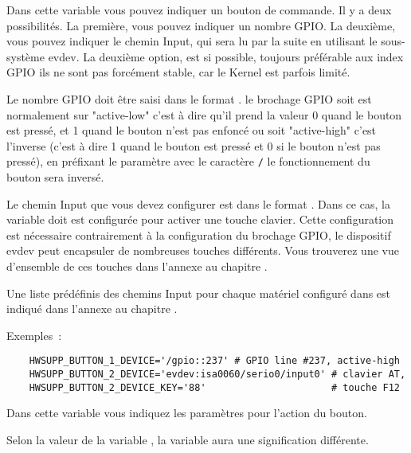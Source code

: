 \begin{description}

  Dans cette variable vous pouvez indiquer un bouton de commande. Il y a deux
  possibilités. La première, vous pouvez indiquer un nombre GPIO. La deuxième,
  vous pouvez indiquer le chemin Input, qui sera lu par la suite en utilisant
  le sous-système evdev. La deuxième option, est si possible, toujours préférable
  aux index GPIO ils ne sont pas forcément stable, car le Kernel est parfois limité.
  
  Le nombre GPIO doit être saisi dans le format . le brochage GPIO soit
  est normalement sur "active-low" c'est à dire qu'il prend la valeur 0 quand le bouton
  est pressé, et 1 quand le bouton n'est pas enfoncé ou soit "active-high" c'est
  l'inverse (c'est à dire 1 quand le bouton est pressé et 0 si le bouton n'est pas
  pressé), en préfixant le paramètre avec le caractère \texttt{/} le fonctionnement
  du bouton sera inversé.
  
  Le chemin Input que vous devez configurer est dans le format .
  Dans ce cas, la variable  doit est configurée
  pour activer une touche clavier. Cette configuration est nécessaire contrairement
  à la configuration du brochage GPIO, le dispositif evdev peut encapsuler de nombreuses
  touches différents. Vous trouverez une vue d'ensemble de ces touches dans
  l'annexe au chapitre .
  
  Une liste prédéfinis des chemins Input pour chaque matériel configuré dans 
  est indiqué dans l'annexe au chapitre .

  Exemples~:
  \begin{verbatim}
    HWSUPP_BUTTON_1_DEVICE='/gpio::237' # GPIO line #237, active-high
    HWSUPP_BUTTON_2_DEVICE='evdev:isa0060/serio0/input0' # clavier AT,
    HWSUPP_BUTTON_2_DEVICE_KEY='88'                      # touche F12
  \end{verbatim}


  Dans cette variable vous indiquez les paramètres pour l'action du bouton.

  Selon la valeur de la variable , la variable
   aura une signification différente.


\end{description}
